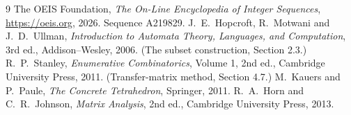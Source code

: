 \documentclass[11pt,a4paper]{article}
\theoremstyle{plain}
\theoremstyle{definition}
\begin{document}
\begin{thebibliography}{9}
 The OEIS Foundation, \emph{The On-Line Encyclopedia of Integer
Sequences}, \url{https://oeis.org}, 2026. Sequence A219829.
 J.~E.~Hopcroft, R.~Motwani and J.~D.~Ullman, \emph{Introduction to Automata
Theory, Languages, and Computation}, 3rd ed., Addison--Wesley, 2006. (The subset
construction, Section 2.3.)
 R.~P.~Stanley, \emph{Enumerative Combinatorics}, Volume 1, 2nd ed.,
Cambridge University Press, 2011. (Transfer-matrix method, Section 4.7.)
 M.~Kauers and P.~Paule, \emph{The Concrete Tetrahedron}, Springer, 2011.
 R.~A.~Horn and C.~R.~Johnson, \emph{Matrix Analysis}, 2nd ed., Cambridge
University Press, 2013.
\end{thebibliography}
\end{document}
